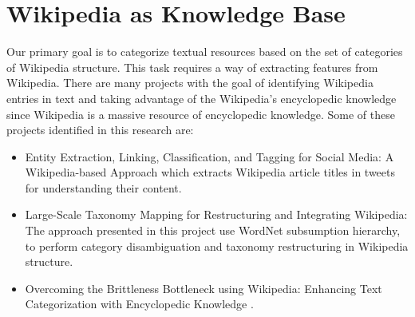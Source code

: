 


\section{\hspace*{3pt}Wikipedia as Knowledge Base}


Our primary goal is to categorize textual resources based on the set of categories of Wikipedia structure. This task requires a way of extracting features from Wikipedia.
There are many projects with the goal of identifying Wikipedia entries in text and taking advantage of the Wikipedia’s encyclopedic knowledge since Wikipedia is a massive resource of encyclopedic knowledge. Some of these projects identified in this research are: 

\begin{itemize}

\item  Entity Extraction, Linking, Classification, and Tagging for Social Media: A Wikipedia-based Approach \cite{gattani2013entity} which extracts Wikipedia article titles
in tweets for understanding their content.

\item Large-Scale Taxonomy Mapping for Restructuring and Integrating Wikipedia\cite{ponzetto2009large}: The approach presented in this project use WordNet subsumption hierarchy, to perform category disambiguation and taxonomy restructuring in Wikipedia structure.

\item Overcoming the Brittleness Bottleneck using Wikipedia: Enhancing Text Categorization with Encyclopedic Knowledge \cite{Gabrilovich:2006}.

\end{itemize}

